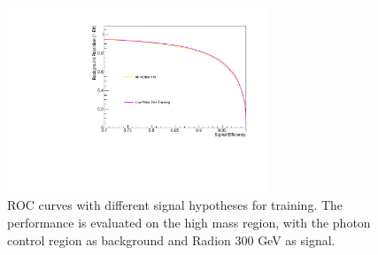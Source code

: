 \begin{figure}[thb]
  \centering
  \includegraphics[width=0.7\textwidth]{figures/sec-cats/mva/ROC_res}\hfil
  \caption{ROC curves with different signal hypotheses for training. The performance is evaluated on the high mass region, with the photon control region as background and Radion 300 GeV as signal.}
  \label{fig:mva_cc_res}
\end{figure}


